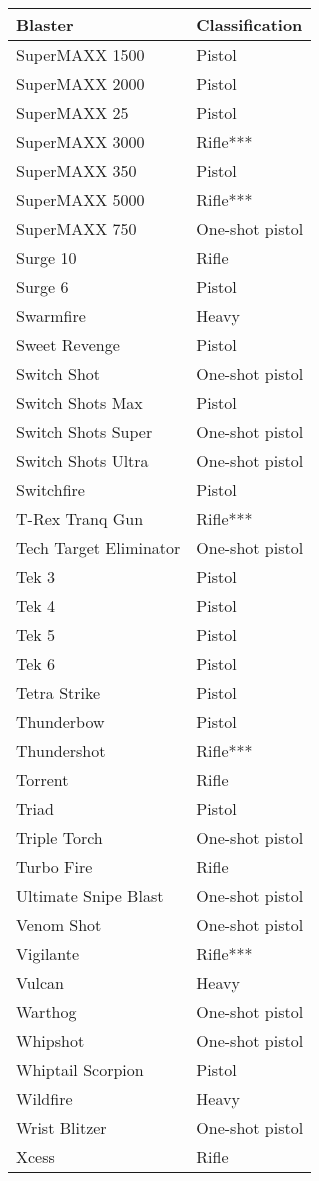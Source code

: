 \documentclass{scrbook}
\begin{document}
\begin{table}
\begin{tabular}{|l|l|} \hline 
Blaster & Classification \\
 \hline SuperMAXX 1500 & Pistol \\
 \hline SuperMAXX 2000 & Pistol \\
 \hline SuperMAXX 25 & Pistol \\
 \hline SuperMAXX 3000 & Rifle*** \\
 \hline SuperMAXX 350 & Pistol \\
 \hline SuperMAXX 5000 & Rifle*** \\
 \hline SuperMAXX 750 & One-shot pistol \\
 \hline Surge 10 & Rifle \\
 \hline Surge 6 & Pistol \\
 \hline Swarmfire & Heavy \\
 \hline Sweet Revenge & Pistol \\
 \hline Switch Shot & One-shot pistol \\
 \hline Switch Shots Max & Pistol \\
 \hline Switch Shots Super & One-shot pistol \\
 \hline Switch Shots Ultra & One-shot pistol \\
 \hline Switchfire & Pistol \\
 \hline T-Rex Tranq Gun & Rifle*** \\
 \hline Tech Target Eliminator & One-shot pistol \\
 \hline Tek 3 & Pistol \\
 \hline Tek 4 & Pistol \\
 \hline Tek 5 & Pistol \\
 \hline Tek 6 & Pistol \\
 \hline Tetra Strike & Pistol \\
 \hline Thunderbow & Pistol \\
 \hline Thundershot & Rifle*** \\
 \hline Torrent & Rifle \\
 \hline Triad & Pistol \\
 \hline Triple Torch & One-shot pistol \\
 \hline Turbo Fire & Rifle \\
 \hline Ultimate Snipe Blast & One-shot pistol \\
 \hline Venom Shot & One-shot pistol \\
 \hline Vigilante & Rifle*** \\
 \hline Vulcan & Heavy \\
 \hline Warthog & One-shot pistol \\
 \hline Whipshot & One-shot pistol \\
 \hline Whiptail Scorpion & Pistol \\
 \hline Wildfire & Heavy \\
 \hline Wrist Blitzer & One-shot pistol \\
 \hline Xcess & Rifle \\
 \hline \end{tabular}

\end{table}
\end{document}
